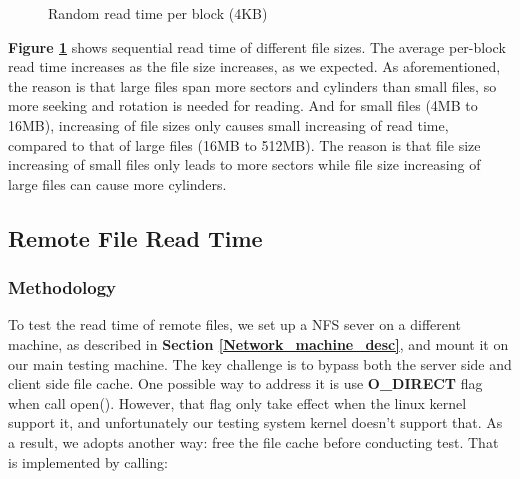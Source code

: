 \begin{figure}[ht]
    \centering
    \caption{Random read time per block (4KB)}
    \label{rand_read_time}
\end{figure}

\textbf{Figure \ref{rand_read_time}} shows sequential read time of different file sizes. The average per-block read time increases as the file size increases, as we expected. As aforementioned, the reason is that large files span more sectors and cylinders than small files, so more seeking and rotation is needed for reading. And for small files (4MB to 16MB), increasing of file sizes only causes small increasing of read time, compared to that of large files (16MB to 512MB).
The reason is that file size increasing of small files only leads to more sectors while file size increasing of large files can cause more cylinders.

\subsection{Remote File Read Time}

\subsubsection{Methodology}
To test the read time of remote files, we set up a NFS sever on a different machine, as described in \textbf{Section \ref{Network_machine_desc}}, and mount it on our main testing machine. The key challenge is to bypass both the server side and client side file cache. One possible way to address it is use \textbf{O_DIRECT} flag when call open(). However, that flag only take effect when the linux kernel support it, and unfortunately our testing system kernel doesn't support that. As a result,
we adopts another way: free the file cache before conducting test. That is implemented by calling:

